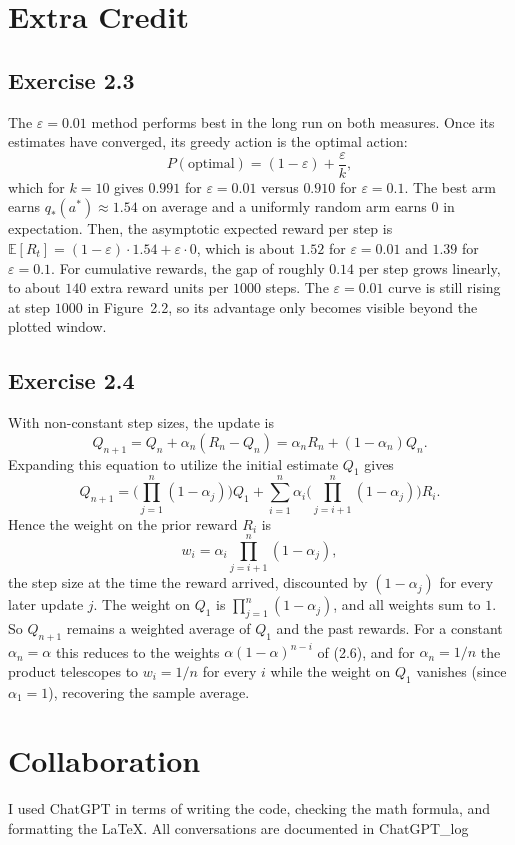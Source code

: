 \documentclass{article}
\begin{document}
\section{Extra Credit}
\subsection*{Exercise 2.3}
The $\varepsilon = 0.01$ method performs best in the long run on both measures.
Once its estimates have converged, its greedy action is the optimal action:
\[
    P(\text{optimal}) = (1 - \varepsilon) + \frac{\varepsilon}{k},
\]
which for $k=10$ gives $0.991$ for $\varepsilon = 0.01$ versus $0.910$ for
$\varepsilon = 0.1$. The best arm earns $q_*(a^*) \approx 1.54$ on average and a
uniformly random arm earns $0$ in expectation. Then, the asymptotic expected
reward per step is $\mathbb{E}[R_t] = (1-\varepsilon)\cdot 1.54 + \varepsilon
\cdot 0$, which is about $1.52$ for $\varepsilon=0.01$ and $1.39$ for
$\varepsilon=0.1$. For cumulative rewards, the gap of roughly $0.14$ per step
grows linearly, to about $140$ extra reward units per $1000$ steps. The
$\varepsilon = 0.01$ curve is still rising at step $1000$ in Figure~2.2, so its
advantage only becomes visible beyond the plotted window.

\subsection*{Exercise 2.4}
With non-constant step sizes, the update is
\[
    Q_{n+1} = Q_n + \alpha_n (R_n - Q_n)
    = \alpha_n R_n + (1 - \alpha_n) Q_n.
\]
Expanding this equation to utilize the initial estimate $Q_1$ gives
\[
    Q_{n+1} = \Big(\prod_{j=1}^{n} (1-\alpha_j)\Big) Q_1 + \sum_{i=1}^{n} \alpha_i \Big(\prod_{j=i+1}^{n} (1-\alpha_j)\Big) R_i.
\]
Hence the weight on the prior reward $R_i$ is
\[
    w_i = \alpha_i \prod_{j=i+1}^{n}(1 - \alpha_j),
\]
the step size at the time the reward arrived, discounted by $(1 - \alpha_j)$ for
every later update $j$. The weight on $Q_1$ is $\prod_{j=1}^{n}(1-\alpha_j)$,
and all weights sum to $1$. So $Q_{n+1}$ remains a weighted average of $Q_1$ and
the past rewards. For a constant $\alpha_n = \alpha$ this reduces to the weights
$\alpha(1-\alpha)^{n-i}$ of (2.6), and for $\alpha_n = 1/n$ the product
telescopes to $w_i = 1/n$ for every $i$ while the weight on $Q_1$ vanishes
(since $\alpha_1 = 1$), recovering the sample average.
\section*{Collaboration}
I used ChatGPT in terms of writing the code, checking the math formula, and
formatting the LaTeX. All conversations are documented in ChatGPT\_log
\end{document}
